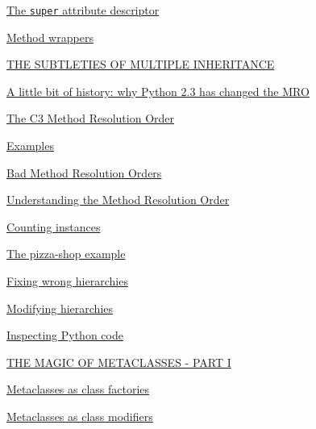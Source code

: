 \documentclass[10pt,english]{article}
\begin{document}
\begin{list}{}{}
\begin{list}{}{}
\item {} \href{\#the-super-attribute-descriptor}{The \texttt{super} attribute descriptor}

\item {} \href{\#method-wrappers}{Method wrappers}

\end{list}

\item {} \href{\#the-subtleties-of-multiple-inheritance}{THE SUBTLETIES OF MULTIPLE INHERITANCE}
\begin{list}{}{}
\item {} \href{\#a-little-bit-of-history-why-python-2-3-has-changed-the-mro}{A little bit of history: why Python 2.3 has changed the MRO}

\item {} \href{\#the-c3-method-resolution-order}{The C3 Method Resolution Order}

\item {} \href{\#examples}{Examples}

\item {} \href{\#bad-method-resolution-orders}{Bad Method Resolution Orders}

\item {} \href{\#understanding-the-method-resolution-order}{Understanding the Method Resolution Order}

\item {} \href{\#counting-instances}{Counting instances}

\item {} \href{\#the-pizza-shop-example}{The pizza-shop example}

\item {} \href{\#fixing-wrong-hierarchies}{Fixing wrong hierarchies}

\item {} \href{\#modifying-hierarchies}{Modifying hierarchies}

\item {} \href{\#inspecting-python-code}{Inspecting Python code}

\end{list}

\item {} \href{\#the-magic-of-metaclasses-part-i}{THE MAGIC OF METACLASSES - PART I}
\begin{list}{}{}
\item {} \href{\#metaclasses-as-class-factories}{Metaclasses as class factories}

\item {} \href{\#metaclasses-as-class-modifiers}{Metaclasses as class modifiers}


\end{list}
\end{list}
\end{document}
